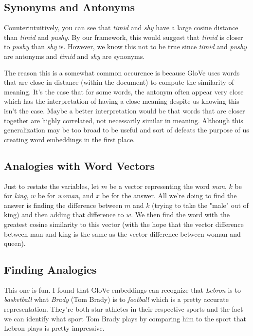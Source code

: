 \documentclass[12pt]{article}
\begin{document}
\subsection{Synonyms and Antonyms}
Counterintuitively, you can see that \emph{timid} and \emph{shy} have a large cosine distance than 
\emph{timid} and \emph{pushy}. By our framework, this would suggest that \emph{timid} is closer to 
\emph{pushy} than \emph{shy} is. However, we know this not to be true since \emph{timid} and \emph{pushy}
are antonyms and \emph{timid} and \emph{shy} are synonyms. 

The reason this is a somewhat common occurence is because GloVe uses words that are close in distance 
(within the document) to compute the similarity of meaning. It's the case that for some words, the antonym 
often appear very close which has the interpretation of having a close meaning despite us knowing this isn't
the case. Maybe a better interpretation would be that words that are closer together are highly correlated, 
not necessarily similar in meaning. Although this generalization may be too broad to be useful and 
sort of defeats the purpose of us creating word embeddings in the first place. 

\subsection{Analogies with Word Vectors}
Just to restate the variables, let $m$ be a vector representing the word \emph{man}, $k$ be for 
\emph{king}, $w$ be for \emph{woman}, and $x$ be for the answer. All we're doing to find the answer
is finding the difference between $m$ and $k$ (trying to take the "male" out of king) and then adding
that difference to $w$. We then find the word with the greatest
cosine similarity to this vector (with the hope that the vector difference between man and king is the 
same as the vector difference between woman and queen). 

\subsection{Finding Analogies}
This one is fun. I found that GloVe embeddings can recognize that \emph{Lebron} is to \emph{basketball}
what \emph{Brady} (Tom Brady) is to \emph{football} which is a pretty accurate representation. They're 
both star athletes in their respective sports and the fact we can identify what sport Tom Brady plays 
by comparing him to the sport that Lebron plays is pretty impressive. 
\end{document}
